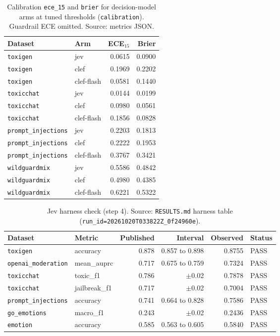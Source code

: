 \begin{table}[htbp]
\centering
\caption{Calibration \texttt{ece\_15} and \texttt{brier} for decision-model arms at tuned thresholds (\texttt{calibration}). Guardrail ECE omitted. Source: metrics JSON.}
\label{tab:calibration-decision-models}
\small
\begin{tabular}{@{}llrr@{}}
\toprule
Dataset & Arm & ECE$_{15}$ & Brier \\
\midrule
\texttt{toxigen} & jev & 0.0615 & 0.0900 \\
\texttt{toxigen} & clef & 0.1969 & 0.2202 \\
\texttt{toxigen} & clef-flash & 0.0581 & 0.1440 \\
\texttt{toxicchat} & jev & 0.0144 & 0.0199 \\
\texttt{toxicchat} & clef & 0.0980 & 0.0561 \\
\texttt{toxicchat} & clef-flash & 0.1856 & 0.0828 \\
\texttt{prompt\_injections} & jev & 0.2203 & 0.1813 \\
\texttt{prompt\_injections} & clef & 0.2222 & 0.1953 \\
\texttt{prompt\_injections} & clef-flash & 0.3767 & 0.3421 \\
\texttt{wildguardmix} & jev & 0.5586 & 0.4842 \\
\texttt{wildguardmix} & clef & 0.4980 & 0.4385 \\
\texttt{wildguardmix} & clef-flash & 0.6221 & 0.5322 \\
\bottomrule
\end{tabular}
\end{table}

\begin{table}[htbp]
\centering
\caption{Jev harness check (step 4). Source: \texttt{RESULTS.md} harness table (\texttt{run\_id=20261020T033822Z\_0f24960e}).}
\label{tab:harness-check}
\small
\begin{tabular}{@{}llrrrl@{}}
\toprule
Dataset & Metric & Published & Interval & Observed & Status \\
\midrule
\texttt{toxigen} & accuracy & 0.878 & 0.857 to 0.898 & 0.8755 & PASS \\
\texttt{openai\_moderation} & mean\_auprc & 0.717 & 0.675 to 0.759 & 0.7324 & PASS \\
\texttt{toxicchat} & toxic\_f1 & 0.786 & $\pm$0.02 & 0.7878 & PASS \\
\texttt{toxicchat} & jailbreak\_f1 & 0.717 & $\pm$0.02 & 0.7004 & PASS \\
\texttt{prompt\_injections} & accuracy & 0.741 & 0.664 to 0.828 & 0.7586 & PASS \\
\texttt{go\_emotions} & macro\_f1 & 0.243 & $\pm$0.02 & 0.2436 & PASS \\
\texttt{emotion} & accuracy & 0.585 & 0.563 to 0.605 & 0.5840 & PASS \\
\bottomrule
\end{tabular}
\end{table}

